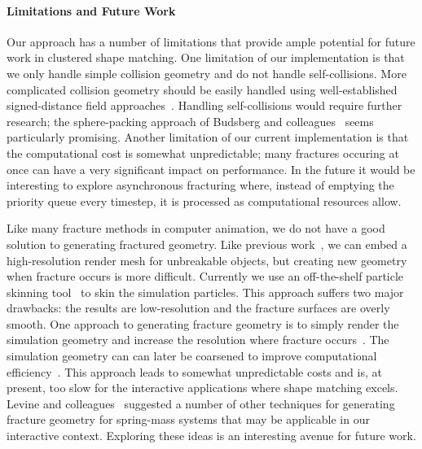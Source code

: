\documentclass[review]{acmsiggraph}
\begin{document}

\paragraph{Limitations and Future Work}
Our approach has a number of limitations that provide ample potential for future work in clustered shape matching.
One limitation of our implementation is that we only handle simple collision geometry and do not handle self-collisions.
More complicated collision geometry should be easily handled using well-established signed-distance field approaches~\cite{Guendelman:2003:NRB}.
Handling self-collisions would require further research; the sphere-packing approach of Budsberg and colleagues~
seems particularly promising.  
Another limitation of our current implementation is that the computational cost is somewhat unpredictable; many fractures occuring at once
can have a very significant impact on performance.  In the future it would be interesting to explore asynchronous fracturing
where, instead of emptying the priority queue every timestep, it is processed as computational resources allow.

Like many fracture methods in computer animation, we do not have a good solution to generating fractured
geometry.  Like previous work~\cite{Mueller:2005:MDB,Rivers:2007:FFL}, we can embed a high-resolution 
render mesh for unbreakable objects, but creating new geometry when fracture occurs is more difficult.  
Currently we use an off-the-shelf particle skinning tool~\cite{Bhattacharya:2015:ALM} to skin the simulation particles.
This approach suffers two major drawbacks: the results are low-resolution and the fracture surfaces are overly smooth.
One approach to generating fracture geometry is to simply render the simulation geometry and increase the resolution 
where fracture occurs~\cite{Obrien:1999:GMA,Obrien:2002:GMA}.  The simulation geometry can can later be 
coarsened to improve computational efficiency~\cite{Pfaff:2014:ATC}.  This approach leads to
somewhat unpredictable costs and is, at present, too slow for the interactive applications where shape matching excels.
Levine and colleagues~ suggested a number of other techniques for generating fracture geometry
for spring-mass systems that may be applicable in our interactive context.  Exploring these ideas is an interesting avenue 
for future work.
\end{document}
